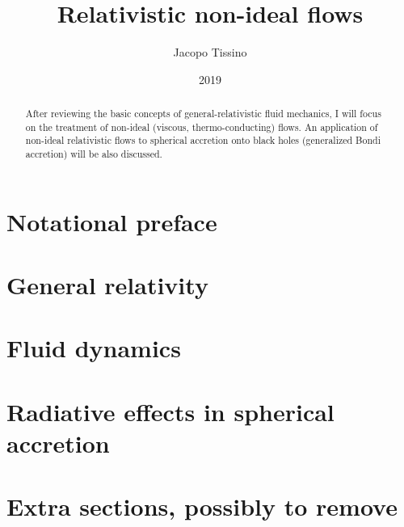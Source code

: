 \documentclass[a4paper, 11pt]{article}
\title{Relativistic non-ideal flows}
\author{Jacopo Tissino}
\date{2019}
\begin{document}


\begin{abstract}
After reviewing the basic concepts of general-relativistic fluid mechanics, I will focus on the treatment of non-ideal
(viscous, thermo-conducting) flows. An application of non-ideal relativistic flows to spherical accretion onto black holes
(generalized Bondi accretion) will be also discussed.
\end{abstract}

\setcounter{tocdepth}{4}
\tableofcontents

\section{Notational preface} \label{sec:notational-preface}


\section{General relativity} \label{sec:general-relativity}


\section{Fluid dynamics} \label{sec:fluid-dynamics}


\section{Radiative effects in spherical accretion} \label{sec:radiative-effects}


\section{Extra sections, possibly to remove}


\printbibliography[title={Bibliography}]

\end{document}
